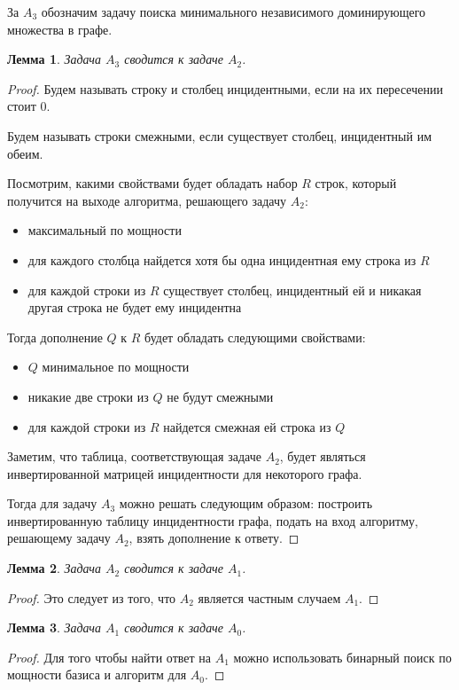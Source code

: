 \documentclass[a4paper,14pt]{extreport}
\newtheorem{lm}{Лемма}
\begin{document}
За $A_3$ обозначим задачу поиска минимального независимого доминирующего множества в графе.

\begin{lm}
Задача $A_3$ сводится к задаче $A_2$.
\end{lm}
\begin{proof}
Будем называть строку и столбец инцидентными, если на их пересечении стоит 0. 

Будем называть строки смежными, если существует столбец, инцидентный им обеим.

Посмотрим, какими свойствами будет обладать набор $R$ строк, который получится на выходе алгоритма, решающего задачу $A_2$:
\begin{itemize}
\item максимальный по мощности    
\item для каждого столбца найдется хотя бы одна инцидентная ему строка из $R$
\item для каждой строки из $R$ существует столбец, инцидентный ей и никакая другая строка не будет ему инцидентна     
\end{itemize}

Тогда дополнение $Q$ к $R$ будет обладать следующими свойствами:
\begin{itemize}
\item $Q$ минимальное по мощности    
\item никакие две строки из $Q$ не будут смежными
\item для каждой строки из $R$ найдется смежная ей строка из $Q$     
\end{itemize}

Заметим, что таблица, соответствующая задаче $A_2$, будет являться инвертированной матрицей инцидентности для некоторого графа.

Тогда для задачу $A_3$ можно решать следующим образом: построить инвертированную таблицу инцидентности графа, подать на вход алгоритму, решающему задачу $A_2$, взять дополнение к ответу.
\end{proof}

\begin{lm}
Задача $A_2$ сводится к задаче $A_1$.
\end{lm}
\begin{proof}
Это следует из того, что $A_2$ является частным случаем $A_1$.
\end{proof}

\begin{lm}
Задача $A_1$ сводится к задаче $A_0$.
\end{lm}
\begin{proof}
Для того чтобы найти ответ на $A_1$ можно использовать бинарный поиск по мощности базиса и алгоритм для $A_0$.
\end{proof}
\end{document}
